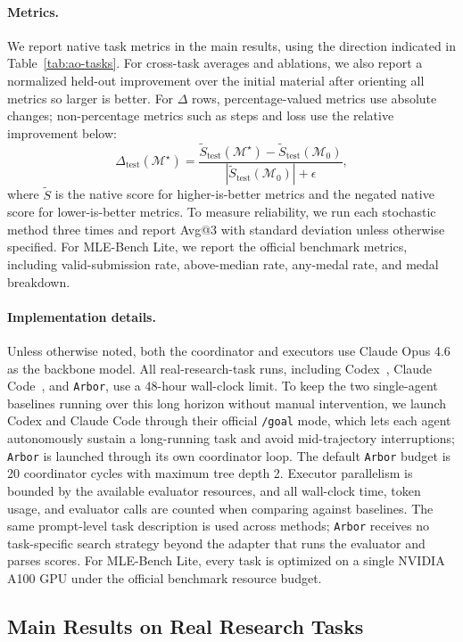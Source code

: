 \documentclass{llmxive}
\providecommand{\arbor}{\texttt{Arbor}}
\providecommand{\Mat}{\mathcal{M}}
\providecommand{\test}{\mathrm{test}}
\begin{document}
\paragraph{Metrics.}
We report native task metrics in the main results, using the direction indicated
in Table~\ref{tab:ao-tasks}. For cross-task averages and ablations, we also
report a normalized held-out improvement over the initial material after
orienting all metrics so larger is better. For $\Delta$ rows,
percentage-valued metrics use absolute changes; non-percentage metrics such as
steps and loss use the relative improvement below:
\[
  \Delta_{\test}(\Mat^\star)
  = \frac{\tilde{S}_{\test}(\Mat^\star)-\tilde{S}_{\test}(\Mat_0)}
         {|\tilde{S}_{\test}(\Mat_0)|+\epsilon},
\]
where $\tilde{S}$ is the native score for higher-is-better metrics and the
negated native score for lower-is-better metrics. To measure reliability, we run
each stochastic method three times and report Avg@3 with standard deviation
unless otherwise specified. For MLE-Bench Lite, we report the official benchmark
metrics, including valid-submission rate, above-median rate, any-medal rate, and
medal breakdown.

\paragraph{Implementation details.}
Unless otherwise noted, both the coordinator and executors use
Claude Opus 4.6 as the backbone model. All real-research-task runs, including
Codex~\citep{codex}, Claude Code~\citep{claudecode}, and \arbor{}, use a 48-hour wall-clock limit. To keep the
two single-agent baselines running over this long horizon without manual
intervention, we launch Codex and Claude Code through their official
\texttt{/goal} mode, which lets each agent autonomously sustain a long-running
task and avoid mid-trajectory interruptions; \arbor{} is launched through its
own coordinator loop. The default \arbor{} budget is 20 coordinator cycles
with maximum tree depth 2. Executor parallelism is bounded by the available
evaluator resources, and all wall-clock time, token usage, and evaluator calls
are counted when comparing against baselines. The same prompt-level task
description is used across methods; \arbor{} receives no task-specific search
strategy beyond the adapter that runs the evaluator and parses scores. For
MLE-Bench Lite, every task is optimized on a single NVIDIA A100 GPU under the
official benchmark resource budget.

\subsection{Main Results on Real Research Tasks}
\label{sec:exp-main}
\end{document}
